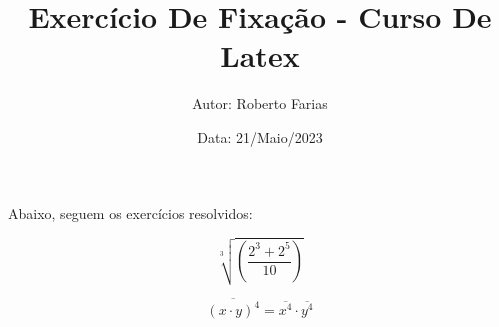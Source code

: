 \documentclass[a4paper,12pt]{article}
\title{\textbf{Exercício De Fixação - Curso De Latex}}
\author{Autor: Roberto Farias}
\date{Data: 21/Maio/2023}
\begin{document}
\maketitle %

Abaixo, seguem os exercícios resolvidos:

\begin{equation}
	\sqrt[3]{\left(\frac{2^3+2^5}{10}\right)}
\end{equation}

\begin{equation}
	\overline{(x \cdot y)^4}=\overline{x^4} \cdot \overline{y^4}
\end{equation}
\end{document}
